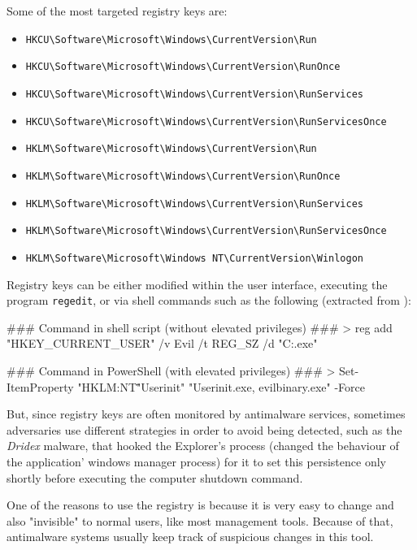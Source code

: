 \begin{itemize}
\pagebreak
Some of the most targeted registry keys are:
\begin{itemize}%
\item \verb|HKCU\Software\Microsoft\Windows\CurrentVersion\Run|
\item \verb|HKCU\Software\Microsoft\Windows\CurrentVersion\RunOnce|
\item \verb|HKCU\Software\Microsoft\Windows\CurrentVersion\RunServices|
\item \verb|HKCU\Software\Microsoft\Windows\CurrentVersion\RunServicesOnce|
\item \verb|HKLM\Software\Microsoft\Windows\CurrentVersion\Run|
\item \verb|HKLM\Software\Microsoft\Windows\CurrentVersion\RunOnce|
\item \verb|HKLM\Software\Microsoft\Windows\CurrentVersion\RunServices|
\item \verb|HKLM\Software\Microsoft\Windows\CurrentVersion\RunServicesOnce|
\item \verb|HKLM\Software\Microsoft\Windows NT\CurrentVersion\Winlogon|
\end{itemize}

Registry keys can be either modified within the user interface, executing the program  \verb|regedit|, or via shell commands such as the following (extracted from \cite{PayloadAllTheThings}):
\vspace{7pt}
\begin{spverbatim}
### Command in shell script (without elevated privileges) ###
> reg add "HKEY_CURRENT_USER\Software\Microsoft\Windows\CurrentVersion\Run" /v Evil /t REG_SZ /d "C:\Users\user\backdoor.exe"

### Command in PowerShell (with elevated privileges) ###
> Set-ItemProperty "HKLM:\Software\Microsoft\Windows NT\CurrentVersion\Winlogon\" "Userinit" "Userinit.exe, evilbinary.exe" -Force
\end{spverbatim}

\vspace{10pt}
But, since registry keys are often monitored by antimalware services, sometimes adversaries use different strategies in order to avoid being detected, such as the \textit{Dridex} malware, that hooked the Explorer's process (changed the behaviour of the application' windows manager process) for it to set this persistence only shortly before executing the computer shutdown command\cite{Dridex}.

One of the reasons to use the registry is because it is very easy to change and also "invisible" to normal users, like most management tools. Because of that, antimalware systems usually keep track of suspicious changes in this tool.


\end{itemize}
